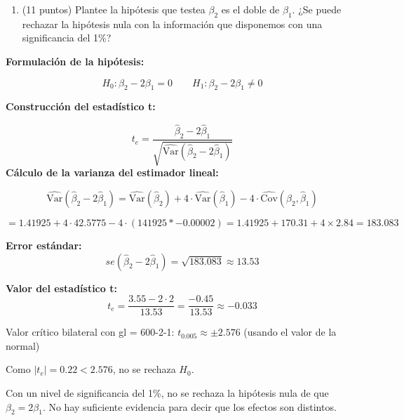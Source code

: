 \documentclass[10pt,a4paper]{article}
\begin{document}
\begin{enumerate}
\begin{enumerate}
{   \[
    \widehat{\text{Var}}(\hat{\beta}_1) = 141925 \times 0.00030 = 42.5775\\
    \]
    
El error estándar: $\hat{\beta}_1$.

 $\sqrt{42.5775} \approx 6.53$

  \[
    \widehat{\text{Var}}(\hat{\beta}_2) = 141925 \times 0.00001 = 1.41925\\ \]
    
El error estándar: $\hat{\beta}_2$.

 $\sqrt{1.41925} \approx 1.19$}
 
\item(11 puntos) Plantee la hip\'otesis  que testea $\beta_2$ es el doble de  $\beta_1$. 
¿Se puede rechazar la hipótesis nula con la información que disponemos con una significancia del 1\%?
\end{enumerate}

{\color{blue}  \textbf{Formulación de la hipótesis:}

\[
H_0: \beta_2 - 2\beta_1 = 0 \qquad H_1: \beta_2 - 2\beta_1 \neq 0
\]

 \textbf{Construcción del estadístico t:}

\[
t_e = \frac{\hat{\beta}_2 - 2\hat{\beta}_1}{\sqrt{\widehat{\text{Var}}(\hat{\beta}_2 - 2\hat{\beta}_1)}}
\]
 \textbf{Cálculo de la varianza del estimador lineal:}

\[
\widehat{\text{Var}}(\hat{\beta}_2 - 2\hat{\beta}_1) =
\widehat{\text{Var}}(\hat{\beta}_2) + 4 \cdot \widehat{\text{Var}}(\hat{\beta}_1) - 4 \cdot \widehat{\text{Cov}}(\hat{\beta}_2, \hat{\beta}_1)
\]

\[
= 1.41925 + 4 \cdot 42.5775 - 4 \cdot (141925*-0.00002) = 1.41925 + 170.31 + 4\times 2.84 = 183.083
\]

 \textbf{Error estándar:}
\[
se(\hat{\beta}_2 - 2\hat{\beta}_1) = \sqrt{183.083} \approx 13.53
\]

 \textbf{Valor del estadístico t:}
\[
t_e = \frac{3.55 - 2 \cdot 2}{13.53} = \frac{-0.45}{13.53} \approx -0.033
\]



Valor crítico bilateral con gl = 600-2-1: $t_{0.005} \approx \pm 2.576$ (usando el valor de la normal)

Como $|t_e| = 0.22 < 2.576$, no se rechaza $H_0$.

Con un nivel de significancia del 1\%, no se rechaza la hipótesis nula de que $\beta_2 = 2\beta_1$. No hay suficiente evidencia para decir que los efectos son distintos. }


\end{enumerate}
\end{document}
